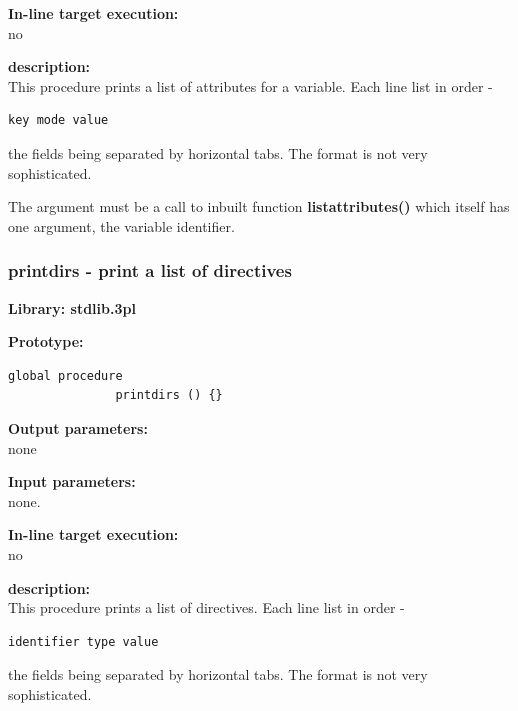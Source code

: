             {\bf In-line target execution:} \\
            no

            {\bf description:} \\
            This procedure prints a list of attributes for a variable. Each line
            list in order -
            \begin{lstlisting}[gobble=12, language=threepl]
               key mode value
            \end{lstlisting}
            the fields being separated by horizontal tabs. The format is
            not very sophisticated.
        
            The argument must be a call to inbuilt function
            {\bf listattributes()}  which itself
            has one argument, the variable identifier.



        \subsubsection{printdirs - print a list of directives}\label{sec:lpprintdirs}

            {\bf Library: stdlib.3pl}

            {\bf Prototype:} \\
            \vsp
            \begin{lstlisting}[gobble=12, language=threepl]
               global procedure
               printdirs () {}
            \end{lstlisting}

            {\bf Output parameters:} \\
            none

            {\bf Input parameters:} \\            
            none.
        
            {\bf In-line target execution:} \\
            no

            {\bf description:} \\
            This procedure prints a list of directives. Each line list
            in order -
            \begin{lstlisting}[gobble=12, language=threepl]
               identifier type value
            \end{lstlisting}
            the fields being separated by horizontal tabs. The format is
            not very sophisticated.




